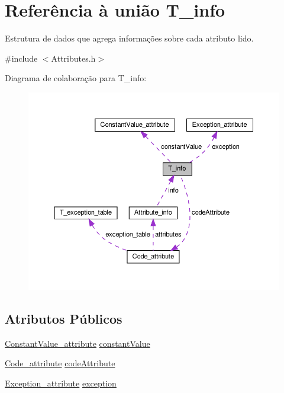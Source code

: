 \hypertarget{unionT__info}{}\section{Referência à união T\+\_\+info}
\label{unionT__info}


Estrutura de dados que agrega informações sobre cada atributo lido.  




{\ttfamily \#include $<$Attributes.\+h$>$}



Diagrama de colaboração para T\+\_\+info\+:\nopagebreak
\begin{figure}[H]
\begin{center}
\leavevmode
\includegraphics[width=350pt]{unionT__info__coll__graph}
\end{center}
\end{figure}
\subsection*{Atributos Públicos}
\begin{DoxyCompactItemize}
\item 
\hyperlink{structConstantValue__attribute}{Constant\+Value\+\_\+attribute} \hyperlink{unionT__info_a523d69820ae3ef82c4e3bbfeb6fc3b84}{constant\+Value}
\item 
\hyperlink{structCode__attribute}{Code\+\_\+attribute} \hyperlink{unionT__info_a6924ca9d9e6afa44575f8a642d3b5612}{code\+Attribute}
\item 
\hyperlink{structException__attribute}{Exception\+\_\+attribute} \hyperlink{unionT__info_a68a6d821e7e97d1ef51c7601694f5a09}{exception}
\end{DoxyCompactItemize}


